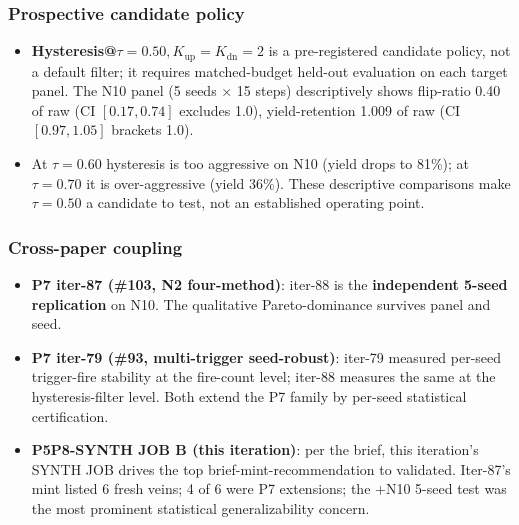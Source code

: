 \subsubsection{Prospective candidate policy}
\begin{itemize}
\item \textbf{Hysteresis@$\tau{=}0.50, K_\text{up}{=}K_\text{dn}{=}2$}
      is a pre-registered candidate policy, not a default filter; it requires
      matched-budget held-out evaluation on each target panel. The N10 panel
      (5 seeds × 15 steps) descriptively shows flip-ratio 0.40 of raw
      (CI $[0.17, 0.74]$ excludes 1.0), yield-retention 1.009 of raw
      (CI $[0.97, 1.05]$ brackets 1.0).
\item At $\tau = 0.60$ hysteresis is too aggressive on N10 (yield drops
      to 81\%); at $\tau = 0.70$ it is over-aggressive (yield 36\%).
      These descriptive comparisons make $\tau = 0.50$ a candidate to test,
      not an established operating point.
\end{itemize}

\subsubsection{Cross-paper coupling}
\begin{itemize}
\item \textbf{P7 iter-87 (\#103, N2 four-method)}: iter-88 is the
      \textbf{independent 5-seed replication} on N10. The
      qualitative Pareto-dominance survives panel and seed.
\item \textbf{P7 iter-79 (\#93, multi-trigger seed-robust)}: iter-79
      measured per-seed trigger-fire stability at the fire-count level;
      iter-88 measures the same at the hysteresis-filter level. Both
      extend the P7 family by per-seed statistical certification.
\item \textbf{P5P8-SYNTH JOB B (this iteration)}: per the brief, this
      iteration's SYNTH JOB drives the top brief-mint-recommendation
      to validated. Iter-87's mint listed 6 fresh veins; 4 of 6 were P7
      extensions; the +N10 5-seed test was the most prominent statistical
      generalizability concern.
\end{itemize}
